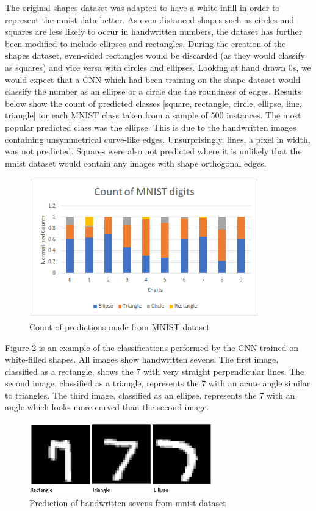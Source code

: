 The original shapes dataset was adapted to have a white infill in order to represent the mnist data better. As even-distanced shapes such as circles and squares are less likely to occur in handwritten numbers, the dataset has further been modified to include ellipses and rectangles. During the creation of the shapes dataset, even-sided rectangles would be discarded (as they would classify as squares) and vice versa with circles and ellipses. Looking at hand drawn 0s, we would expect that a CNN which had been training on the shape dataset would classify the number as an ellipse or a circle due the roundness of edges.
Results below show the count of predicted classes [square, rectangle, circle, ellipse, line, triangle] for each MNIST class taken from a sample of 500 instances. The most popular predicted class was the ellipse. This is due to the handwritten images containing unsymmetrical curve-like edges. Unsurprisingly, lines, a pixel in width, was not predicted.  Squares were also not predicted where it is unlikely that the mnist dataset would contain any images with shape orthogonal edges. 

\begin{figure}
	\begin{center}
		\includegraphics[width=100mm, scale=1]{graph_mnist.png}
		\caption{Count of predictions made from MNIST dataset}
		\label{fig:graph_mnist}
	\end{center}
	
\end{figure}
Figure \ref{fig:mnistseven} is an example of the classifications performed by the CNN trained on white-filled shapes. All images show handwritten sevens. The first image, classified as a rectangle, shows the 7 with very straight perpendicular lines. The second image, classified as a triangle, represents the 7 with an acute angle similar to triangles. The third image, classified as an ellipse, represents the 7 with an angle which looks more curved than the second image. 
\begin{figure}[H]
	\begin{center}
		\includegraphics[width=80mm, scale=1]{mnistseven.png}
		\caption{Prediction of handwritten sevens from mnist dataset}
		\label{fig:mnistseven}
	\end{center}
	
\end{figure}
